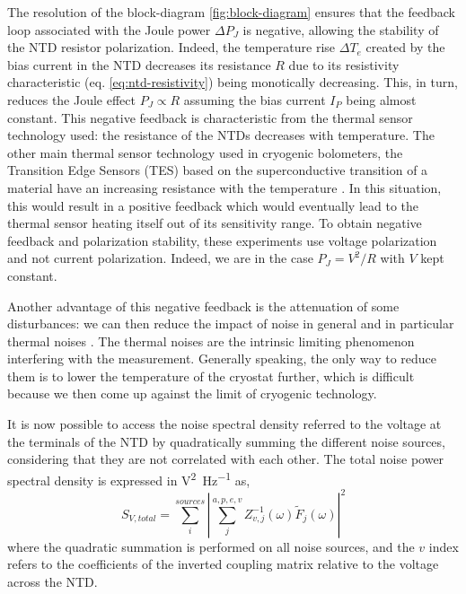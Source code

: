 The resolution of the block-diagram \ref{fig:block-diagram} ensures that the feedback loop associated with the Joule power $\Delta P_J$ is negative,
 allowing the stability of the NTD resistor polarization.
Indeed, the temperature rise $\Delta T_e$ created by the bias current in the NTD decreases its resistance $R$ due to its resistivity characteristic (eq. \ref{eq:ntd-resistivity}) being monotically decreasing. This, in turn, reduces the Joule effect $P_J \propto R$ assuming the bias current $I_P$ being almost constant.
This negative feedback is characteristic from the thermal sensor technology used: the resistance of the NTDs decreases with temperature. The other main thermal sensor technology used in cryogenic bolometers, the Transition Edge Sensors (TES) based on the superconductive transition of a material have 
an increasing resistance with the temperature \cite{Billard:2012} \cite{Figueroa:2006}. In this situation, this would result in a positive feedback which would eventually lead to the thermal sensor heating itself out of its sensitivity range. To obtain negative feedback and polarization stability, these experiments use voltage polarization and not current polarization. Indeed, we are in the case $P_J=V^2/R$ with $V$ kept constant.

Another advantage of this negative feedback is the attenuation of some disturbances: we can then reduce the impact of noise in general and in particular thermal noises \cite{Mather:1982}. 
The thermal noises are the intrinsic limiting phenomenon interfering with the measurement. Generally speaking, the only way to reduce them is to lower the temperature of the cryostat further, which is difficult because we then come up against the limit of cryogenic technology.

It is now possible to access the noise spectral density referred to the voltage at the terminals of the NTD by quadratically summing the different noise sources, considering that they are not correlated with each other. The total noise power spectral density is expressed in \si{\volt^2\per\Hz} as,
\begin{equation}
\label{eq:ethem-psd-total}
S_{V,total} = \sum_i^{sources} \left\vert \sum_j^{a,p,e,v} Z_{v,j}^{-1} (\omega) \tilde{F}_j(\omega) \right\vert^2
\end{equation}
where the quadratic summation is performed on all noise sources, and the $v$ index refers to the coefficients of the inverted coupling matrix relative to the voltage across the NTD.

